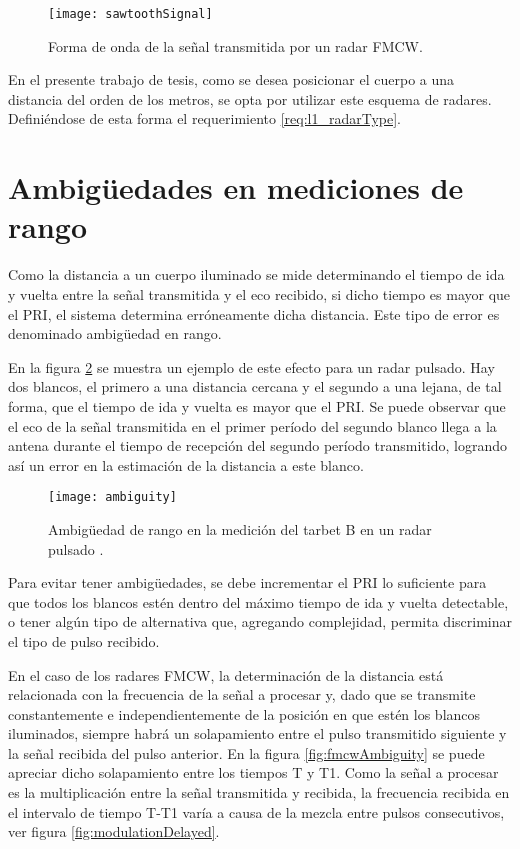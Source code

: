 \begin{figure}[H]
 \centering
 \texttt{[image: sawtoothSignal]}
 \caption{Forma de onda de la señal transmitida por un radar FMCW.}
 \label{fig:continuousWaveform}
\end{figure}

En el presente trabajo de tesis, como se desea posicionar el cuerpo a una distancia del orden de los metros, se opta por utilizar este esquema de radares. Definiéndose de esta forma el requerimiento \ref{req:l1_radarType}.


\section{Ambigüedades en mediciones de rango} \label{sc:ambiguity}

Como la distancia a un cuerpo iluminado se mide determinando el tiempo de ida y vuelta entre la señal transmitida y el eco recibido, si dicho tiempo es mayor que el PRI, el sistema determina erróneamente dicha distancia. Este tipo de error es denominado ambigüedad en rango.

En la figura \ref{fig:ambiguity} se muestra un ejemplo de este efecto para un radar pulsado. Hay dos blancos, el primero a una distancia cercana y el segundo a una lejana, de tal forma, que el tiempo de ida y vuelta es mayor que el PRI. Se puede observar que el eco de la señal transmitida en el primer período del segundo blanco llega a la antena durante el tiempo de recepción del segundo período transmitido, logrando así un error en la estimación de la distancia a este blanco.

\begin{figure}[H]
 \centering
 \texttt{[image: ambiguity]}
 \caption{Ambigüedad de rango en la medición del tarbet B en un radar pulsado \cite{Richards2010}.}
 \label{fig:ambiguity}
\end{figure}

Para evitar tener ambigüedades, se debe incrementar el PRI lo suficiente para que todos los blancos estén dentro del máximo tiempo de ida y vuelta detectable, o tener algún tipo de alternativa que, agregando complejidad, permita discriminar el tipo de pulso recibido.

En el caso de los radares FMCW, la determinación de la distancia está relacionada con la frecuencia de la señal a procesar y, dado que se transmite constantemente e independientemente de la posición en que estén los blancos iluminados, siempre habrá un solapamiento entre el pulso transmitido siguiente y la señal recibida del pulso anterior. En la figura \ref{fig:fmcwAmbiguity} se puede apreciar dicho solapamiento entre los tiempos T y T1. Como la señal a procesar es la multiplicación entre la señal transmitida y recibida, la frecuencia recibida en el intervalo de tiempo T-T1 varía a causa de la mezcla entre pulsos consecutivos, ver figura \ref{fig:modulationDelayed}.

